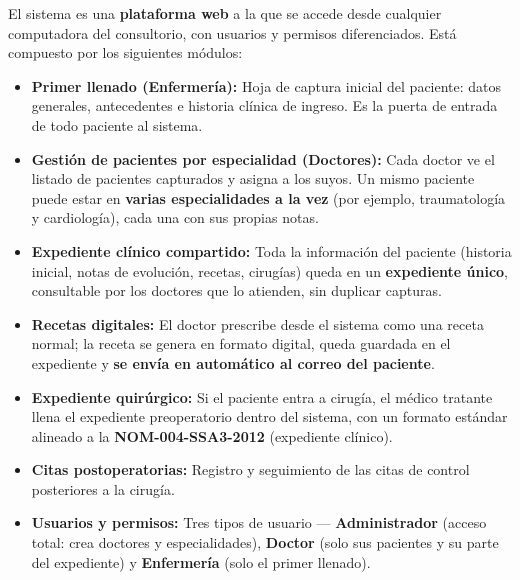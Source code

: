 \documentclass[11pt,letterpaper]{article}
\begin{document}
\vspace{8pt}

\noindent El sistema es una \textbf{plataforma web} a la que se accede desde cualquier computadora del consultorio, con usuarios y permisos diferenciados. Está compuesto por los siguientes módulos:

\vspace{6pt}

\begin{itemize}[leftmargin=16pt, itemsep=4pt, topsep=4pt]
    \item \textbf{Primer llenado (Enfermería):} Hoja de captura inicial del paciente: datos generales, antecedentes e historia clínica de ingreso. Es la puerta de entrada de todo paciente al sistema.
    \item \textbf{Gestión de pacientes por especialidad (Doctores):} Cada doctor ve el listado de pacientes capturados y asigna a los suyos. Un mismo paciente puede estar en \textbf{varias especialidades a la vez} (por ejemplo, traumatología y cardiología), cada una con sus propias notas.
    \item \textbf{Expediente clínico compartido:} Toda la información del paciente (historia inicial, notas de evolución, recetas, cirugías) queda en un \textbf{expediente único}, consultable por los doctores que lo atienden, sin duplicar capturas.
    \item \textbf{Recetas digitales:} El doctor prescribe desde el sistema como una receta normal; la receta se genera en formato digital, queda guardada en el expediente y \textbf{se envía en automático al correo del paciente}.
    \item \textbf{Expediente quirúrgico:} Si el paciente entra a cirugía, el médico tratante llena el expediente preoperatorio dentro del sistema, con un formato estándar alineado a la \textbf{NOM-004-SSA3-2012} (expediente clínico).
    \item \textbf{Citas postoperatorias:} Registro y seguimiento de las citas de control posteriores a la cirugía.
    \item \textbf{Usuarios y permisos:} Tres tipos de usuario --- \textbf{Administrador} (acceso total: crea doctores y especialidades), \textbf{Doctor} (solo sus pacientes y su parte del expediente) y \textbf{Enfermería} (solo el primer llenado).
\end{itemize}

\vspace{12pt}
\end{document}
